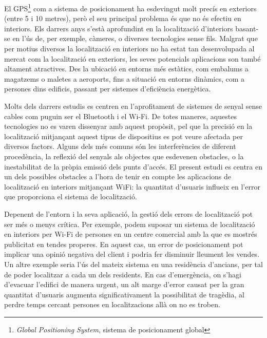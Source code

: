 
El GPS\footnote{\textit{Global Positioning System}, sistema de posicionament global} com a sistema de posicionament ha esdevingut molt precís en exteriors (entre 5 i 10 metres\cite{pogge}), però el seu principal problema és que no és efectiu en interiors. Els darrers anys s’està aprofundint en la localització d’interiors basant-se en l’ús de, per exemple, càmeres, o diverses tecnologies sense fils. Malgrat que per motius diversos la localització en interiors no ha estat tan desenvolupada al mercat com la localització en exteriors, les seves potencials aplicacions son també altament atractives. Des la ubicació en entorns més estàtics, com embalums a magatzems o maletes a aeroports, fins a situació en entorns dinàmics, com a persones dins edificis, passant per sistemes d'eficiència energètica.

Molts dels darrers estudis es centren en l’aprofitament de sistemes de senyal sense cables com puguin ser el Bluetooth\cite{kotanen} i el Wi-Fi\cite{bagosi}\cite{evennou}\cite{garcia}. De totes maneres, aquestes tecnologies no es varen dissenyar amb aquest propòsit, pel que la precisió en la localització mitjançant aquest tipus de dispositius es pot veure afectada per diversos factors. Alguns dels més comuns són les interferències de diferent procedència, la reflexió del senyals als objectes que esdevenen obstacles, o la inestabilitat de la pròpia emissió dels punts d'accés. El present estudi es centra en un dels possibles obstacles a l'hora de tenir en compte les aplicacions de localització en interiors mitjançant WiFi: la quantitat d'usuaris influeix en l’error que proporciona el sistema de localització.

Depenent de l’entorn i la seva aplicació, la gestió dels errors de localització pot ser més o menys crítica. Per exemple, podem suposar un sistema de localització en interiors per Wi-Fi de persones en un centre comercial amb la que es mostrés publicitat en tendes properes. En aquest cas, un error de posicionament pot implicar una opinió negativa del client i podria fer disminuir lleument les vendes. Un altre exemple seria l’ús del mateix sistema en una residència d’ancians, per tal de poder localitzar a cada un dels residents. En cas d’emergència, on s’hagi d’evacuar l’edifici de manera urgent, un alt marge d’error causat per la gran quantitat d'usuaris augmenta significativament la possibilitat de tragèdia, al perdre temps cercant persones en localitzacions allà on no es troben.

